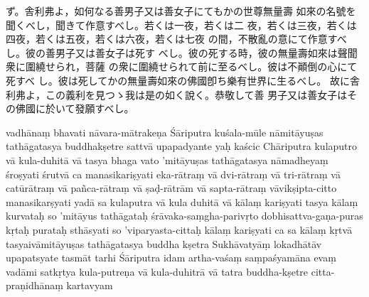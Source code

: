 \newpage
\noindent
ず。舎利弗よ，如何なる善男子又は善女子にてもかの世尊無量壽
如來の名號を聞くべし，聞きて作意すべし。若くは一夜，若くは二
夜，若くは三夜，若くは四夜，若くは五夜，若くは六夜，若くは七夜
の間，不散亂の意にて作意すべし。彼の善男子又は善女子は死す
べし。彼の死する時，彼の無量壽如來は聲聞衆に圍繞せられ，菩薩
の衆に圍繞せられて前に至るべし。彼は不顚倒の心にて死すべ
し。彼は死してかの無量壽如來の佛國卽ち樂有世界に生るべし。
故に舎利弗よ，この義利を見つゝ我は是の如く說く。恭敬して善
男子又は善女子はその佛國に於いて發願すべし。

\newpage
vadhānaṃ bhavati nāvara-mātrakeṇa Śāriputra kuśala-mūle\-%
nāmitāyuṣas tathāgatasya buddhakṣetre sattvā upapadyante \da{}
yaḥ kaścic Chāriputra kulaputro vā kula-duhitā vā tasya bhaga\-%
vato 'mitāyuṣas tathāgatasya nāmadheyaṃ śroṣyati śrutvā
ca manasikariṣyati eka-rātraṃ vā dvi-rātraṃ vā tri-rātraṃ vā
catūrātraṃ vā pañca-rātraṃ vā ṣaḍ-rātrām vā sapta-rātraṃ
vāvikṣipta-citto manasikarṣyati yadā sa kulaputra vā kula\-%
duhitā vā kālaṃ kariṣyati tasya kālaṃ kurvataḥ so 'mitāyus
tathāgataḥ śrāvaka-saṃgha-parivṛto dobhisattva-gaṇa-puras\-%
kṛtaḥ purataḥ sthāsyati so 'viparyasta-cittaḥ kālaṃ kariṣyati
ca \da{} sa kālaṃ kṛtvā tasyaivāmitāyuṣas tathāgatasya buddha\-%
kṣetra Sukhāvatyāṃ lokadhātāv upapatsyate \da{} tasmāt tarhi
Śāriputra idam artha-vaśaṃ saṃpaśyamāna evaṃ vadāmi \da{}
satkṛtya kula-putreṇa vā kula-duhitrā vā tatra buddha-kṣetre
citta-praṇidhānaṃ kartavyam \dd


